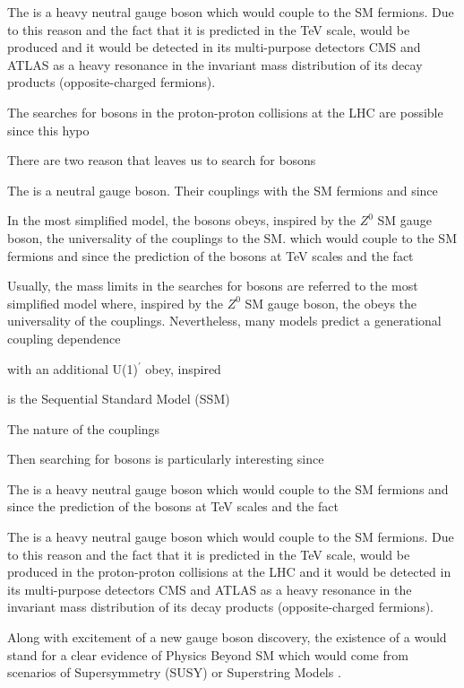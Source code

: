 The \Zprime is a heavy neutral gauge boson which would couple to the SM fermions. Due to this reason and the fact that it is predicted 
in the TeV scale, \Zprime would be produced 
 and it would be detected in its multi-purpose detectors 
CMS and ATLAS as a heavy resonance in the invariant mass distribution of its decay products (opposite-charged fermions). 



The searches for \Zprime bosons in the proton-proton collisions at the LHC are possible since this hypo



There are two reason that leaves us to search for \Zprime bosons 


The \Zprime is a neutral gauge boson. Their couplings with the SM fermions and since

In the most simplified model, the \Zprime bosons obeys, inspired by the $Z^{0}$ SM gauge boson, the
universality of the couplings to the SM. 
which would couple to the SM fermions and since the prediction 
of the \Zprime bosons at TeV scales and the fact

Usually, the
mass limits in the searches for \Zprime bosons are referred to the most simplified model where, inspired by the $Z^{0}$ SM gauge boson, the
\Zprime obeys the universality of the couplings. Nevertheless, many models predict a generational coupling dependence 



with an additional U(1)$^{\prime}$ obey, inspired


is the Sequential Standard Model (SSM)


The nature of the couplings




Then searching for \Zprime bosons is particularly 
interesting since


The \Zprime is a heavy neutral gauge boson which would couple to the SM fermions and since the prediction 
of the \Zprime bosons at TeV scales and the fact 

The \Zprime is a heavy neutral gauge boson which would couple to the SM fermions. Due to this reason and the fact that it is predicted 
in the TeV scale, \Zprime would be produced in the proton-proton collisions at the LHC and it would be detected in its multi-purpose detectors 
CMS and ATLAS as a heavy resonance in the invariant mass distribution of its decay products (opposite-charged fermions). 

Along with excitement of a new gauge boson discovery, the existence of a \Zprime  would stand for a clear evidence of Physics
Beyond SM which would come from scenarios of Supersymmetry (SUSY) or Superstring Models \cite{Langacker:2008yv}. 

